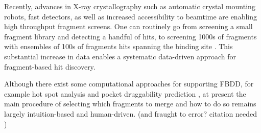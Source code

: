Recently, advances in X-ray crystallography such as automatic crystal mounting robots, fast detectors, as well as increased accessibility to beamtime are enabling high throughput fragment screens. One can routinely go from screening a small fragment library and detecting a handful of hits, to screening 1000s of fragments with ensembles of 100s of fragments hits spanning the binding site \cite{Schiebel2016HighThroughput, Douangamath2020XChem}. This substantial increase in data enables a systematic data-driven approach for fragment-based hit discovery. 

Although there exist some computational approaches for supporting FBDD, for example hot spot analysis and pocket druggability prediction \cite{deSouza2020InSilicoFBDD}, at present the main procedure of selecting which fragments to merge and how to do so remains largely intuition-based and human-driven. (and fraught to error? citation needed \cite{?})




